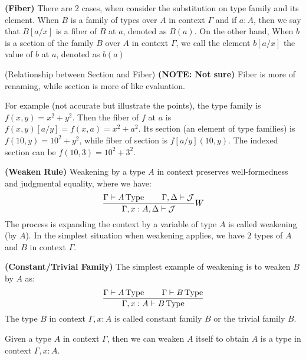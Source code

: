 \begin{definition}{\textbf{(Fiber)}}
    There are 2 cases, when consider the substitution on type family and its element. When $B$ is a family of types over $A$ in context $\Gamma$ and if $a:A$, then we say that $B[a/x]$ is a fiber of $B$ at $a$, denoted as $B(a)$. On the other hand, When $b$ is a section of the family $B$ over $A$ in context $\Gamma$, we call the element $b[a/x]$ the value of $b$ at $a$, denoted as $b(a)$
\end{definition}

\begin{remark}{(Relationship between Section and Fiber)}
    \textbf{(NOTE: Not sure)} Fiber is more of renaming, while section is more of like evaluation.
    
    For example (not accurate but illustrate the points), the type family is $f(x, y)= x^2+y^2$. Then the fiber of $f$ at $a$ is $f(x, y)[a/y]=f(x, a)=x^2+a^2$. Its section (an element of type families) is $f(10, y)=10^2+y^2$, while fiber of section is $f[a/y](10, y)$. The indexed section can be $f(10, 3)=10^2+3^2$.
\end{remark}

\begin{definition}{\textbf{(Weaken Rule)}}
    Weakening by a type $A$ in context preserves well-formedness and judgmental equality, where we have:
    \begin{equation*}
        \frac{\Gamma\vdash A\operatorname{Type} \qquad \Gamma,\Delta\vdash\mathcal{J}}{\Gamma,x:A,\Delta\vdash\mathcal{J}}W
    \end{equation*}
    The process is expanding the context by a variable of type $A$ is called weakening (by $A$). In the simplest situation when weakening applies, we have $2$ types of $A$ and $B$ in context $\Gamma$.   
\end{definition}

\begin{definition}{\textbf{(Constant/Trivial Family)}}
    The simplest example of weakening is to weaken $B$ by $A$ as:
    \begin{equation*}
        \frac{\Gamma\vdash A\operatorname{Type} \qquad \Gamma\vdash B\operatorname{Type} }{\Gamma,x:A\vdash B\operatorname{Type} }
    \end{equation*}
    The type $B$ in context $\Gamma,x:A$ is called constant family $B$ or the trivial family $B$.
\end{definition}

Given a type $A$ in context $\Gamma$, then we can weaken $A$ itself to obtain $A$ is a type in context $\Gamma,x:A$. 

